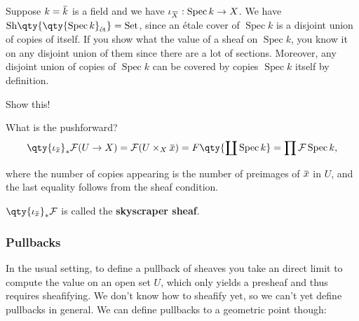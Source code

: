 \begin{example}[?]

Suppose
\(k=\mkern 1.5mu\overline{\mkern-1.5muk\mkern-1.5mu}\mkern 1.5mu\) is a
field and we have
\(\iota_{\mkern 1.5mu\overline{\mkern-1.5muX\mkern-1.5mu}\mkern 1.5mu}:\operatorname{Spec}k\to X\).
We have
\({\operatorname{Sh}}\qty{\qty{\operatorname{Spec}k}_{\text{ét}}} = {\operatorname{Set}}\),
since an étale cover of \(\operatorname{Spec}k\) is a disjoint union of
copies of itself. If you show what the value of a sheaf on
\(\operatorname{Spec}k\), you know it on any disjoint union of them
since there are a lot of sections. Moreover, any disjoint union of
copies of \(\operatorname{Spec}k\) can be covered by copies
\(\operatorname{Spec}k\) itself by definition.

\begin{exercise}[?]

Show this!

\end{exercise}

What is the pushforward?
\begin{align*}  
\qty{\iota_{\mkern 1.5mu\overline{\mkern-1.5mux\mkern-1.5mu}\mkern 1.5mu}}_* \mathcal{F}(U\to X) = \mathcal{F}(U\times_X \mkern 1.5mu\overline{\mkern-1.5mux\mkern-1.5mu}\mkern 1.5mu)
= F\qty{{\coprod}\operatorname{Spec}k}
= \prod \mathcal{F}\operatorname{Spec}k
,\end{align*}

where the number of copies appearing is the number of preimages of
\(\mkern 1.5mu\overline{\mkern-1.5mux\mkern-1.5mu}\mkern 1.5mu\) in
\(U\), and the last equality follows from the sheaf condition.

\end{example}

\begin{definition}

\(\qty{\iota_{\mkern 1.5mu\overline{\mkern-1.5mux\mkern-1.5mu}\mkern 1.5mu}}_* \mathcal{F}\)
is called the \textbf{skyscraper sheaf}.

\end{definition}

\hypertarget{pullbacks}{%
\subsubsection{Pullbacks}\label{pullbacks}}

In the usual setting, to define a pullback of sheaves you take an direct
limit to compute the value on an open set \(U\), which only yields a
presheaf and thus requires sheafifying. We don't know how to sheafify
yet, so we can't yet define pullbacks in general. We can define
pullbacks to a geometric point though:

